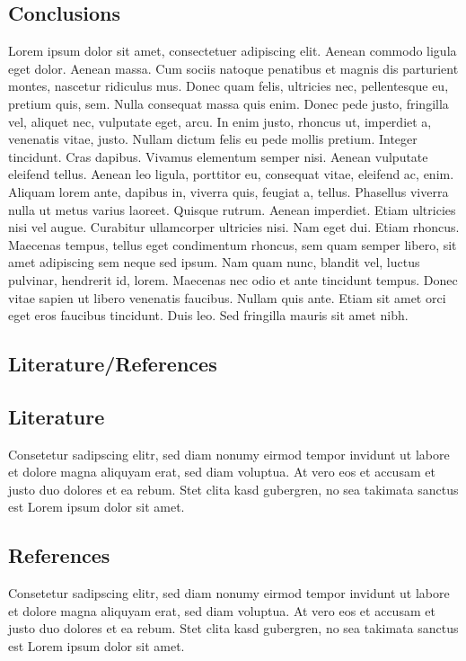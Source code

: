 \documentclass[a1paper, english]{article}
\begin{document}
\begin{posterbox}
	\vspace{-10mm}
	\raggedright

	\section*{Conclusions}
	Lorem ipsum dolor sit amet, consectetuer adipiscing elit. Aenean commodo ligula eget dolor. Aenean massa. Cum sociis natoque penatibus et magnis dis parturient montes, nascetur ridiculus mus. Donec quam felis, ultricies nec, pellentesque eu, pretium quis, sem. Nulla consequat massa quis enim. Donec pede justo, fringilla vel, aliquet nec, vulputate eget, arcu. In enim justo, rhoncus ut, imperdiet a, venenatis vitae, justo. Nullam dictum felis eu pede mollis pretium. Integer tincidunt. Cras dapibus. Vivamus elementum semper nisi. Aenean vulputate eleifend tellus. Aenean leo ligula, porttitor eu, consequat vitae, eleifend ac, enim. Aliquam lorem ante, dapibus in, viverra quis, feugiat a, tellus. Phasellus viverra nulla ut metus varius laoreet. Quisque rutrum. Aenean imperdiet. Etiam ultricies nisi vel augue. Curabitur ullamcorper ultricies nisi. Nam eget dui. Etiam rhoncus. Maecenas tempus, tellus eget condimentum rhoncus, sem quam semper libero, sit amet adipiscing sem neque sed ipsum. Nam quam nunc, blandit vel, luctus pulvinar, hendrerit id, lorem. Maecenas nec odio et ante tincidunt tempus. Donec vitae sapien ut libero venenatis faucibus. Nullam quis ante. Etiam sit amet orci eget eros faucibus tincidunt. Duis leo. Sed fringilla mauris sit amet nibh.
\end{posterbox}

\vfill

\begin{posterbox}
	\vspace{-10mm}
	\raggedright

	\section*{Literature/References}
	\subsection*{Literature}
	Consetetur sadipscing elitr, sed diam nonumy eirmod tempor invidunt ut labore et dolore magna aliquyam erat, sed diam voluptua. At vero eos et accusam et justo duo dolores et ea rebum. Stet clita kasd gubergren, no sea takimata sanctus est Lorem ipsum dolor sit amet.

	\subsection*{References}
	Consetetur sadipscing elitr, sed diam nonumy eirmod tempor invidunt ut labore et dolore magna aliquyam erat, sed diam voluptua. At vero eos et accusam et justo duo dolores et ea rebum. Stet clita kasd gubergren, no sea takimata sanctus est Lorem ipsum dolor sit amet.
\end{posterbox}
\end{document}
